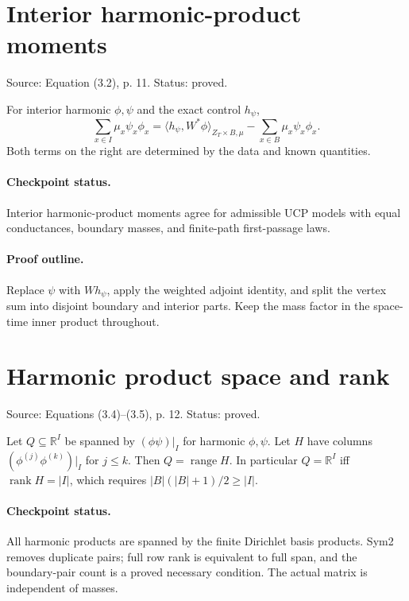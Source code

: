 \section{Interior harmonic-product moments}
Source: Equation (3.2), p. 11. Status: proved.
\begin{lemma}\label{moments}

For interior harmonic $\phi,\psi$ and the exact control $h_\psi$, \[\sum_{x\in I}\mu_x\psi_x\phi_x=\langle h_\psi,W^*\phi\rangle_{Z_T\times B,\mu}-\sum_{x\in B}\mu_x\psi_x\phi_x.\] Both terms on the right are determined by the data and known quantities.


\paragraph{Checkpoint status.}
Interior harmonic-product moments agree for admissible UCP models with equal conductances, boundary masses, and finite-path first-passage laws.
\end{lemma}
\paragraph{Proof outline.}

Replace $\psi$ with $Wh_\psi$, apply the weighted adjoint identity, and split the vertex sum into disjoint boundary and interior parts. Keep the mass factor in the space-time inner product throughout.
\nodebreak
\section{Harmonic product space and rank}
Source: Equations (3.4)–(3.5), p. 12. Status: proved.
\begin{lemma}\label{product-span}

Let $Q\subseteq\mathbb R^I$ be spanned by $(\phi\psi)|_I$ for harmonic $\phi,\psi$. Let $H$ have columns $(\phi^{(j)}\phi^{(k)})|_I$ for $j\leq k$. Then $Q=\operatorname{range}H$. In particular $Q=\mathbb R^I$ iff $\operatorname{rank}H=|I|$, which requires $|B|(|B|+1)/2\geq|I|$.


\paragraph{Checkpoint status.}
All harmonic products are spanned by the finite Dirichlet basis products. Sym2 removes duplicate pairs; full row rank is equivalent to full span, and the boundary-pair count is a proved necessary condition. The actual matrix is independent of masses.
\end{lemma}
